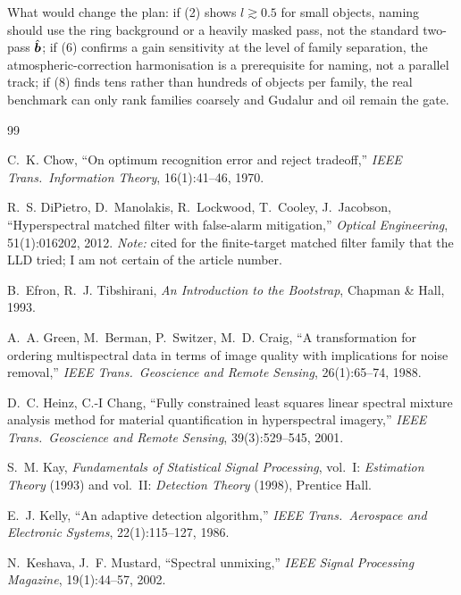 \documentclass[11pt,a4paper]{article}
\theoremstyle{plain}
\theoremstyle{definition}
\theoremstyle{remark}
\newcommand{\bh}{\hat{\B{b}}}
\begin{document}
What would change the plan: if (2) shows $l\gtrsim0.5$ for small objects, naming should use the ring background or a
heavily masked pass, not the standard two-pass $\bh$; if (6) confirms a gain sensitivity at the level of family separation, the
atmospheric-correction harmonisation is a prerequisite for naming, not a parallel track; if (8) finds tens rather than hundreds of
objects per family, the real benchmark can only rank families coarsely and Gudalur and oil remain the gate.

\begin{thebibliography}{99}\small

 C.~K. Chow, ``On optimum recognition error and reject tradeoff,'' \emph{IEEE Trans.\ Information Theory},
16(1):41--46, 1970.

 R.~S. DiPietro, D.~Manolakis, R.~Lockwood, T.~Cooley, J.~Jacobson, ``Hyperspectral matched filter with false-alarm
mitigation,'' \emph{Optical Engineering}, 51(1):016202, 2012. \emph{Note:} cited for the finite-target matched filter family that the
LLD tried; I am not certain of the article number.

 B.~Efron, R.~J. Tibshirani, \emph{An Introduction to the Bootstrap}, Chapman \& Hall, 1993.

 A.~A. Green, M.~Berman, P.~Switzer, M.~D. Craig, ``A transformation for ordering multispectral data in terms of image
quality with implications for noise removal,'' \emph{IEEE Trans.\ Geoscience and Remote Sensing}, 26(1):65--74, 1988.

 D.~C. Heinz, C.-I Chang, ``Fully constrained least squares linear spectral mixture analysis method for material
quantification in hyperspectral imagery,'' \emph{IEEE Trans.\ Geoscience and Remote Sensing}, 39(3):529--545, 2001.

 S.~M. Kay, \emph{Fundamentals of Statistical Signal Processing}, vol.~I: \emph{Estimation Theory} (1993) and vol.~II:
\emph{Detection Theory} (1998), Prentice Hall.

 E.~J. Kelly, ``An adaptive detection algorithm,'' \emph{IEEE Trans.\ Aerospace and Electronic Systems}, 22(1):115--127, 1986.

 N.~Keshava, J.~F. Mustard, ``Spectral unmixing,'' \emph{IEEE Signal Processing Magazine}, 19(1):44--57, 2002.


\end{thebibliography}
\end{document}
